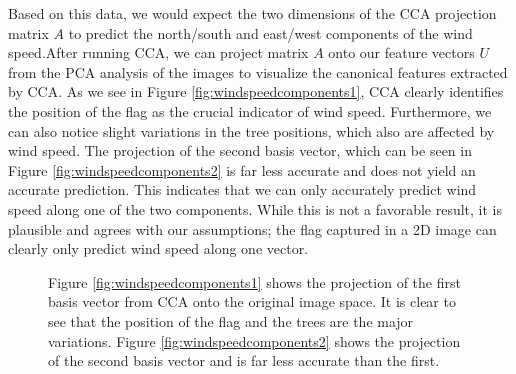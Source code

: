Based on this data, we would expect the two dimensions of the CCA projection matrix $A$ to predict the north/south and east/west components of the wind speed.After running CCA, we can project matrix $A$ onto our feature vectors $U$ from the PCA analysis of the images to visualize the canonical features extracted by CCA. As we see in Figure \ref{fig:windspeedcomponents1}, CCA clearly identifies the position of the flag as the crucial indicator of wind speed. Furthermore, we can also notice slight variations in the tree positions, which also are affected by wind speed. The projection of the second basis vector, which can be seen in Figure \ref{fig:windspeedcomponents2} is far less accurate and does not yield an accurate prediction. This indicates that we can only accurately predict wind speed along one of the two components. While this is not a favorable result, it is plausible and agrees with our assumptions; the flag captured in a 2D image can clearly only predict wind speed along one vector. 
\begin{figure}
	\centering
		\caption{Figure \ref{fig:windspeedcomponents1} shows the projection of the first basis vector from CCA onto the original image space. It is clear to see that the position of the flag and the trees are the major variations. Figure \ref{fig:windspeedcomponents2} shows the projection of the second basis vector and is far less accurate than the first.}
\end{figure}

